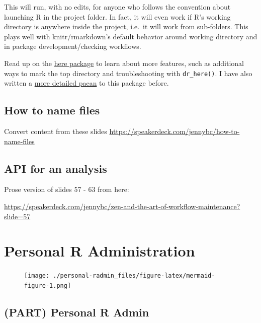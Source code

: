\documentclass[
  letterpaper,
]{book}
\begin{document}
This will run, with no edits, for anyone who follows the convention
about launching R in the project folder. In fact, it will even work if
R's working directory is anywhere inside the project, i.e.~it will work
from sub-folders. This plays well with knitr/rmarkdown's default
behavior around working directory and in package development/checking
workflows.

Read up on the \href{https://CRAN.R-project.org/package=here}{here
package} to learn about more features, such as additional ways to mark
the top directory and troubleshooting with \texttt{dr\_here()}. I have
also written a \href{https://github.com/jennybc/here_here}{more detailed
paean} to this package before.

\hypertarget{how-to-name-files}{%
\chapter{How to name files}\label{how-to-name-files}}

Convert content from these slides
\url{https://speakerdeck.com/jennybc/how-to-name-files}

\hypertarget{api-for-an-analysis}{%
\chapter{API for an analysis}\label{api-for-an-analysis}}

Prose version of slides 57 - 63 from here:

\url{https://speakerdeck.com/jennybc/zen-and-the-art-of-workflow-maintenance?slide=57}

\part{Personal R Administration}

\begin{figure}[H]

{\centering \texttt{[image: ./personal-radmin\_files/figure-latex/mermaid-figure-1.png]}

}

\end{figure}

\hypertarget{part-personal-r-admin}{%
\chapter*{(PART) Personal R Admin}\label{part-personal-r-admin}}
\end{document}

